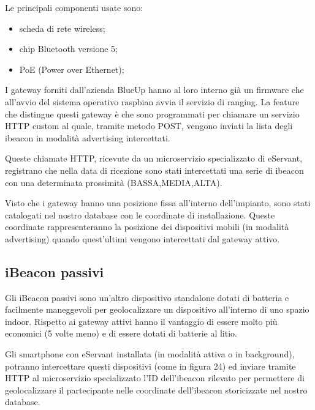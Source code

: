 Le principali componenti usate sono:
\begin{itemize}
    \item scheda di rete wireless;
    \item chip Bluetooth versione 5;
    \item PoE (Power over Ethernet);
\end{itemize}

I gateway forniti dall'azienda BlueUp hanno al loro interno già un firmware che all'avvio del sistema operativo
raspbian avvia il servizio di ranging.
La feature che distingue questi gateway è che sono programmati per chiamare un servizio HTTP custom 
al quale, tramite metodo POST, vengono inviati la lista degli ibeacon in modalità advertising intercettati.

Queste chiamate HTTP, ricevute da un microservizio specializzato di eServant, registrano che nella data
di ricezione sono stati intercettati una serie di ibeacon con una determinata prossimità (BASSA,MEDIA,ALTA).

Visto che i gateway hanno una posizione fissa all'interno dell'impianto, sono stati catalogati nel nostro
database con le coordinate di installazione.
Queste coordinate rappresenteranno la posizione dei dispositivi mobili (in modalità advertising) quando quest'ultimi
vengono intercettati dal gateway attivo.

\subsection{iBeacon passivi}
Gli iBeacon passivi sono un'altro dispositivo standalone dotati di batteria e facilmente maneggevoli per
geolocalizzare un dispositivo all'interno di uno spazio indoor.
Rispetto ai gateway attivi hanno il vantaggio di essere molto più economici (5 volte meno) e di essere
dotati di batterie al litio.

Gli smartphone con eServant installata (in modalità attiva o in background), potranno intercettare
questi dispositivi (come in figura 24) ed inviare tramite HTTP al microservizio specializzato l'ID dell'ibeacon rilevato
per permettere di geolocalizzare il partecipante nelle coordinate dell'ibeacon storicizzate nel nostro
database.

